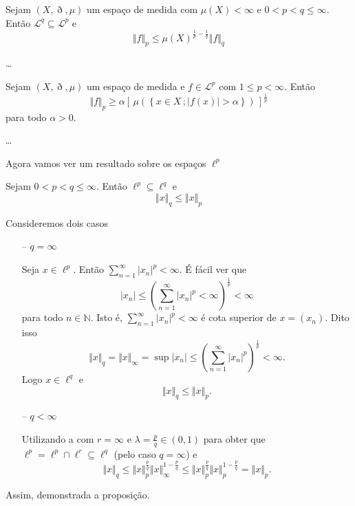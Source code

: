 \documentclass[a4paper, 11pt]{book}
\theoremstyle{definition}
\newcommand{\bN}{\mathbb{N}}
\newcommand{\cL}{\mathcal{L}}
\begin{document}
\begin{pbox}
    Sejam $(X,\eth,\mu)$ um espaço de medida com $\mu(X) < \infty$ e $0 < p < q \leqslant \infty$.
    Então $\cL^q \subseteq \cL^p$ e 
    \[
        \Vert f \Vert_p \leqslant \mu(X)^{\frac{1}{p} - \frac{1}{q}} \Vert f \Vert_q
    \]
\end{pbox}
\begin{prf}
    \dots
\end{prf}

\begin{tbox}
    Sejam $(X,\eth,\mu)$ um espaço de medida e $f \in \cL^p$ com $1 \leqslant p < \infty$. 
    Então
    \[
        \Vert f \Vert_p \geqslant \alpha [\, \mu\left( \left\{ x \in X \,; |f(x)| > \alpha \right\}\right) \,]^{\frac{1}{p}}
    \]
    para todo $\alpha > 0$.
\end{tbox}
\begin{prf}
    \dots
\end{prf}

Agora vamos ver um resultado sobre os espaços $\ell^p$

\begin{pbox}
    Sejam $0 < p < q \leqslant \infty$.
    Então $\ell^p \subseteq \ell^q$ e 
    \[
        \Vert x \Vert_q \leqslant \Vert x \Vert_p
    \]
\end{pbox}
\begin{prf}
    Consideremos dois casos
    \begin{itemize}[leftmargin=*]
        \item[--] $q = \infty$
        
        Seja $x \in \ell^p$.
        Então $\sum_{n=1}^\infty |x_n|^p < \infty$.
        É fácil ver que
        \[
            |x_n| \leqslant \left( \sum_{n=1}^\infty |x_n|^p < \infty \right)^{\frac{1}{p}} < \infty
        \]
        para todo $n \in \bN$. Isto é, $\sum_{n=1}^\infty |x_n|^p < \infty$ é cota superior de $x = (x_n)$. Dito isso
        \[
            \Vert x \Vert_q = \Vert x \Vert_\infty = \sup |x_n| \leqslant \left(\sum_{n=1}^\infty |x_n|^p \right)^{\frac{1}{p}} < \infty.
        \]
        Logo $x \in \ell^q$ e 
        \[
            \Vert x \Vert_q \leqslant \Vert x \Vert_p.
        \]

        \item[--] $q < \infty$
        
        Utilizando a  com $r = \infty$ e $\lambda = \frac{p}{q} \in (0,1)$ para obter que $\ell^p = \ell^p \cap \ell^r \subseteq \ell^q$ (pelo caso $q = \infty$) e
        \[
            \Vert x \Vert_q \leqslant \Vert x \Vert_p^{\frac{p}{q}} \Vert x \Vert_\infty^{1 - \frac{p}{q}} \leqslant \Vert x \Vert_p^{\frac{p}{q}} \Vert x \Vert_p^{1 - \frac{p}{q}} = \Vert x \Vert_p.
        \]
    \end{itemize}
    Assim, demonstrada a proposição.
\end{prf}
\end{document}
